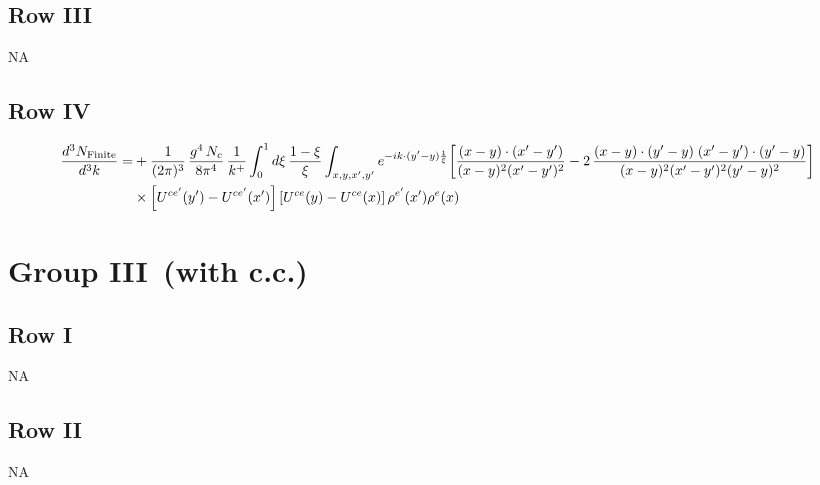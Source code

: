 \documentclass[9pt]{article}
\numberwithin{equation}{section}
\begin{document}
\subsection{Row III}
\textsc{NA}
\subsection{Row IV}
\begin{align}
\frac{d^{3}N_{\rm Finite}}{d^{3}k}= &  +\frac{1}{(2\pi)^{3}}\,\frac{g^{4}\,N_{c}}{8\pi^{4}}\,\frac{1}{k^{+}}\int_{0}^{1}d\xi\,\frac{1-\xi}{\xi}\int_{x,y,x',y'}e^{-ik\cdot(y'-y)\frac{1}{\xi}}\bigg[\frac{(x-y)\cdot(x'-y')}{(x-y)^{2}(x'-y')^{2}}-2\,\frac{(x-y)\cdot(y'-y)\;(x'-y')\cdot(y'-y)}{(x-y)^{2}(x'-y')^{2}(y'-y)^{2}}\bigg]\notag\\
&\times\left[U^{ce'}(y') - U^{ce'}(x')\right]\left[U^{ce}(y) - U^{ce}(x)\right]\rho^{e'}(x')\rho^{e}(x)
\end{align}
\section{Group III\, (with c.c.)}
\subsection{Row I}
\textsc{NA}
\subsection{Row II}
\textsc{NA}
\end{document}
